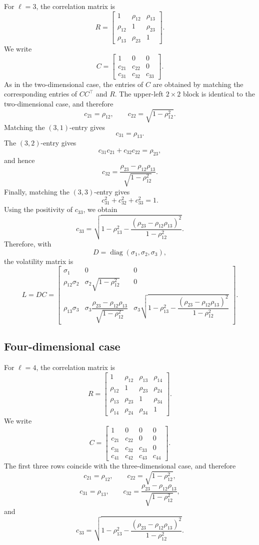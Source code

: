 For \(\ell=3\), the correlation matrix is
\[
R =
\begin{bmatrix}
1 & \rho_{12} & \rho_{13} \\
\rho_{12} & 1 & \rho_{23} \\
\rho_{13} & \rho_{23} & 1
\end{bmatrix}.
\]
We write
\[
C =
\begin{bmatrix}
1 & 0 & 0 \\
c_{21} & c_{22} & 0 \\
c_{31} & c_{32} & c_{33}
\end{bmatrix}.
\]
As in the two-dimensional case, the entries of \(C\) are obtained by
matching the corresponding entries of \(CC^\top\) and \(R\). The upper-left
\(2 \times 2\) block is identical to the two-dimensional case, and therefore
\[
c_{21}=\rho_{12},
\qquad
c_{22}=\sqrt{1-\rho_{12}^2}.
\]
Matching the \((3,1)\)-entry gives
\[
c_{31}=\rho_{13}.
\]
The \((3,2)\)-entry gives
\[
c_{31}c_{21}+c_{32}c_{22}=\rho_{23},
\]
and hence
\[
c_{32}
=
\frac{\rho_{23}-\rho_{12}\rho_{13}}
{\sqrt{1-\rho_{12}^2}}.
\]
Finally, matching the \((3,3)\)-entry gives
\[
c_{31}^2+c_{32}^2+c_{33}^2=1.
\]
Using the positivity of \(c_{33}\), we obtain
\[
c_{33}
=
\sqrt{
1-\rho_{13}^2
-\frac{(\rho_{23}-\rho_{12}\rho_{13})^2}
{1-\rho_{12}^2}
}.
\]
Therefore, with
\[
D=\operatorname{diag}(\sigma_1,\sigma_2,\sigma_3),
\]
the volatility matrix is
\[
L=DC
=
\begin{bmatrix}
\sigma_1 & 0 & 0 \\[0.4em]
\rho_{12}\sigma_2 &
\sigma_2\sqrt{1-\rho_{12}^2} &
0 \\[0.8em]
\rho_{13}\sigma_3 &
\sigma_3
\dfrac{\rho_{23}-\rho_{12}\rho_{13}}
{\sqrt{1-\rho_{12}^2}} &
\sigma_3
\sqrt{
1-\rho_{13}^2
-\dfrac{(\rho_{23}-\rho_{12}\rho_{13})^2}
{1-\rho_{12}^2}
}
\end{bmatrix}.
\]

\subsection{Four-dimensional case}

For \(\ell=4\), the correlation matrix is
\[
R =
\begin{bmatrix}
1 & \rho_{12} & \rho_{13} & \rho_{14} \\
\rho_{12} & 1 & \rho_{23} & \rho_{24} \\
\rho_{13} & \rho_{23} & 1 & \rho_{34} \\
\rho_{14} & \rho_{24} & \rho_{34} & 1
\end{bmatrix}.
\]
We write
\[
C =
\begin{bmatrix}
1 & 0 & 0 & 0 \\
c_{21} & c_{22} & 0 & 0 \\
c_{31} & c_{32} & c_{33} & 0 \\
c_{41} & c_{42} & c_{43} & c_{44}
\end{bmatrix}.
\]
The first three rows coincide with the three-dimensional case, and therefore
\[
c_{21}=\rho_{12},
\qquad
c_{22}=\sqrt{1-\rho_{12}^2},
\]
\[
c_{31}=\rho_{13},
\qquad
c_{32}
=
\frac{\rho_{23}-\rho_{12}\rho_{13}}
{\sqrt{1-\rho_{12}^2}},
\]
and
\[
c_{33}
=
\sqrt{
1-\rho_{13}^2
-\frac{(\rho_{23}-\rho_{12}\rho_{13})^2}
{1-\rho_{12}^2}
}.
\]

